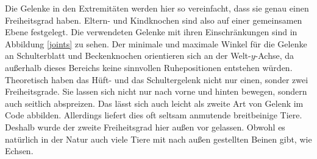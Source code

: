 Die Gelenke in den Extremitäten werden hier so vereinfacht, dass sie genau einen Freiheitsgrad haben. Eltern- und Kindknochen sind also auf einer gemeinsamen Ebene festgelegt. Die verwendeten Gelenke mit ihren Einschränkungen sind in Abbildung \ref{joints} zu sehen. Der minimale und maximale Winkel für die Gelenke an Schulterblatt und Beckenknochen orientieren sich an der Welt-$y$-Achse, da außerhalb dieses Bereichs keine sinnvollen Ruhepositionen entstehen würden. \\
Theoretisch haben das Hüft- und das Schultergelenk nicht nur einen, sonder zwei Freiheitsgrade. Sie lassen sich nicht nur nach vorne und hinten bewegen, sondern auch seitlich abspreizen. Das lässt sich auch leicht als zweite Art von Gelenk im Code abbilden. Allerdings liefert dies oft seltsam anmutende breitbeinige Tiere.
Deshalb wurde der zweite Freiheitsgrad hier außen vor gelassen.
Obwohl es natürlich in der Natur auch viele Tiere mit nach außen gestellten Beinen gibt, wie \zb Echsen.


